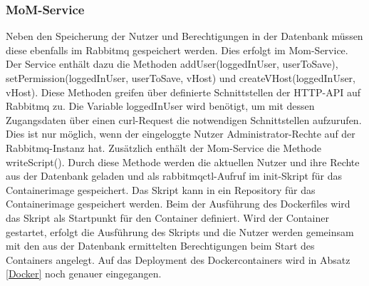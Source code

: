 \subsubsection{MoM-Service}
Neben den Speicherung der Nutzer und Berechtigungen in der Datenbank müssen diese ebenfalls im Rabbitmq gespeichert werden. Dies erfolgt im Mom-Service. Der Service enthält dazu die Methoden addUser(loggedInUser, userToSave), setPermission(loggedInUser, userToSave, vHost) und createVHost(loggedInUser, vHost). Diese Methoden greifen über definierte Schnittstellen der HTTP-API auf Rabbitmq zu. Die Variable loggedInUser wird benötigt, um mit dessen Zugangsdaten über einen curl-Request die notwendigen Schnittstellen aufzurufen. Dies ist nur möglich, wenn der eingeloggte Nutzer Administrator-Rechte auf der Rabbitmq-Instanz hat. Zusätzlich enthält der Mom-Service die Methode writeScript(). Durch diese Methode werden die aktuellen Nutzer und ihre Rechte aus der Datenbank geladen und als rabbitmqctl-Aufruf im init-Skript für das Containerimage gespeichert. Das Skript kann in ein Repository für das Containerimage gespeichert werden. Beim der Ausführung des Dockerfiles  wird das Skript als Startpunkt für den Container definiert. Wird der Container gestartet, erfolgt die Ausführung des Skripts und die Nutzer werden gemeinsam mit den aus der Datenbank ermittelten Berechtigungen beim Start des Containers angelegt. Auf das Deployment des Dockercontainers wird in Absatz \ref{Docker} noch genauer eingegangen.







